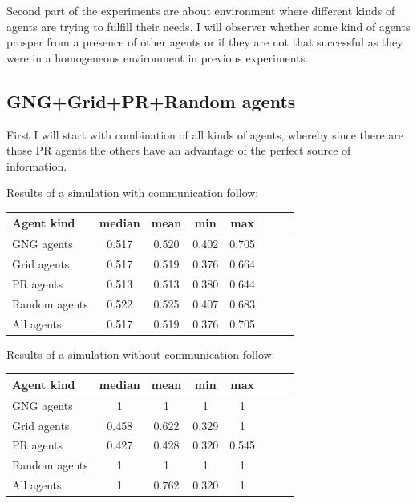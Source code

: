 Second part of the experiments are about environment where different kinds of agents are trying to fulfill their needs. I will observer whether some kind of agents prosper from a presence of other agents or if they are not that successful as they were in a homogeneous environment in previous experiments.
                                                                                
\subsection{GNG+Grid+PR+Random agents}

First I will start with combination of all kinds of agents, whereby since there are those PR agents the others have an advantage of the perfect source of information.  

Results of a simulation with communication follow:
         
\begin{center}   
  \begin{tabular}{l*{6}{c}r}
  Agent kind        & median & mean & min & max \\
  \hline
  GNG agents        & 0.517 & 0.520 & 0.402 & 0.705  \\
  Grid agents       & 0.517 & 0.519 & 0.376 & 0.664  \\   
  PR agents         & 0.513 & 0.513 & 0.380 & 0.644 \\  
  Random agents     & 0.522 & 0.525 & 0.407 & 0.683  \\
  All agents        & 0.517 & 0.519 & 0.376 & 0.705  \\ 
  \end{tabular}                  
\end{center}
       
Results of a simulation without communication follow:
              
\begin{center}
  \begin{tabular}{l*{6}{c}r}
  Agent kind        & median & mean & min & max \\
  \hline
  GNG agents        & 1 & 1 & 1 & 1  \\
  Grid agents       & 0.458 & 0.622 & 0.329 & 1  \\   
  PR agents         & 0.427 & 0.428 & 0.320 & 0.545 \\  
  Random agents     & 1 & 1 & 1 & 1  \\
  All agents        & 1 & 0.762 & 0.320 & 1  \\ 
  \end{tabular}                    
\end{center} 

